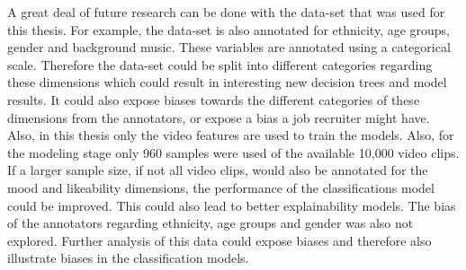 A great deal of future research can be done with the data-set that was used for this thesis. For example, the data-set is also annotated for ethnicity, age groups, gender and background music. These variables are annotated using a categorical scale. Therefore the data-set could be split into different categories regarding these dimensions which could result in interesting new decision trees and model results. It could also expose biases towards the different categories of these dimensions from the annotators, or expose a bias a job recruiter might have. Also, in this thesis only the video features are used to train the models. Also, for the modeling stage only 960 samples were used of the available 10,000 video clips. If a larger sample size, if not all video clips, would also be annotated for the mood and likeability dimensions, the performance of the classifications model could be improved. This could also lead to better explainability models. The bias of the annotators regarding ethnicity, age groups and gender was also not explored. Further analysis of this data could expose biases and therefore also illustrate biases in the classification models. 